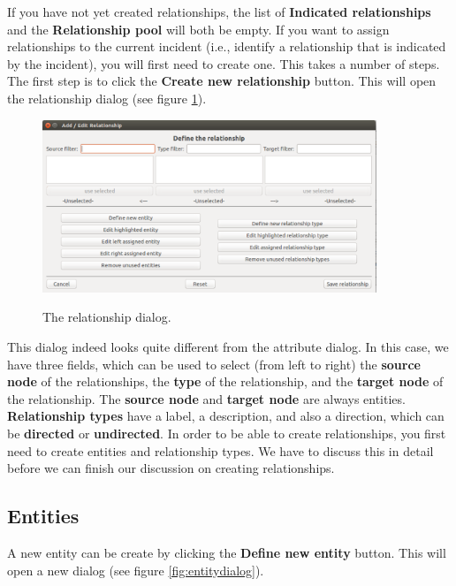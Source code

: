 \documentclass{memoir}
\begin{document}
If you have not yet created relationships, the list of \textbf{Indicated relationships} and the \textbf{Relationship pool} will both be empty. If you want to assign relationships to the current incident (i.e., identify a relationship that is indicated by the incident), you will first need to create one. This takes a number of steps. The first step is to click the \textbf{Create new relationship} button. This will open the relationship dialog (see figure \ref{fig:relationshipdialog}).

\begin{figure}[h!]
  \centering
  \caption{The relationship dialog.}
  \includegraphics[width=100mm]{Screenshot_15.pdf}
  \label{fig:relationshipdialog}
\end{figure}

This dialog indeed looks quite different from the attribute dialog. In this case, we have three fields, which can be used to select (from left to right) the \textbf{source node} of the relationships, the \textbf{type} of the relationship, and the \textbf{target node} of the relationship. The \textbf{source node} and \textbf{target node} are always entities. \textbf{Relationship types} have a label, a description, and also a direction, which can be \textbf{directed} or \textbf{undirected}. In order to be able to create relationships, you first need to create entities and relationship types. We have to discuss this in detail before we can finish our discussion on creating relationships.

\subsection{Entities}
\label{sec:entities}

A new entity can be create by clicking the \textbf{Define new entity} button. This will open a new dialog (see figure \ref{fig:entitydialog}).
\end{document}
